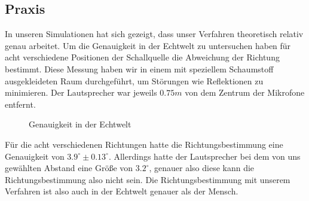 \subsection{Praxis}
In unseren Simulationen hat sich gezeigt, dass unser Verfahren theoretisch relativ genau arbeitet. Um die Genauigkeit in der Echtwelt zu untersuchen haben für acht verschiedene Positionen der Schallquelle die Abweichung der Richtung bestimmt. Diese Messung haben wir in einem mit speziellem Schaumstoff~\cite{basotect} ausgekleideten Raum durchgeführt, um Störungen wie Reflektionen zu minimieren. Der Lautsprecher war jeweils $0.75m$ von dem Zentrum der Mikrofone entfernt.
\begin{figure}[H]
  \centering
  
  \caption{Genauigkeit in der Echtwelt}
  \label{fig:real}
\end{figure}
Für die acht verschiedenen Richtungen hatte die Richtungsbestimmung eine Genauigkeit von $3.9^\circ \pm 0.13^\circ$. Allerdings hatte der Lautsprecher bei dem von uns gewählten Abstand eine Größe von $3.2^\circ$, genauer also diese kann die Richtungsbestimmung also nicht sein. Die Richtungsbestimmung mit unserem Verfahren ist also auch in der Echtwelt genauer als der Mensch.